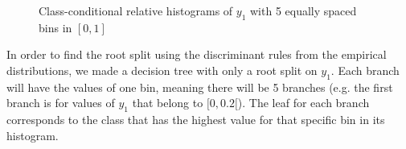 \documentclass[12pt]{article}
\begin{document}
\begin{enumerate}[leftmargin=\labelsep]
        \begin{figure}[H]
          \centering
          \hfill
          \par
          \caption{Class-conditional relative histograms of $y_1$ with 5 equally spaced bins in $[0,1]$}
          \label{fig:class-conditional-y1}
        \end{figure}

        In order to find the root split using the discriminant rules from the empirical distributions, we made a decision tree with only a root split on $y_1$.
        Each branch will have the values of one bin, meaning there will be 5 branches (e.g. the first branch is for values of $y_1$ that belong to $[0,0.2[$).
        The leaf for each branch corresponds to the class that has the highest value for that specific bin in its histogram.


\end{enumerate}
\end{document}
